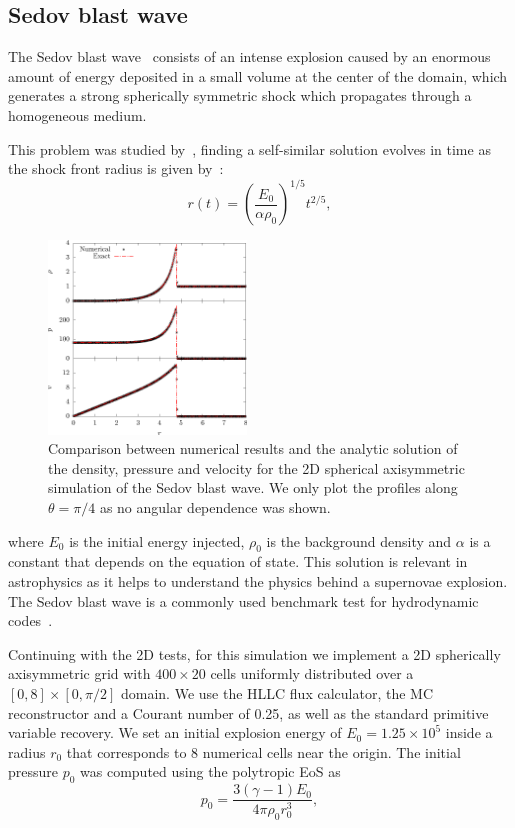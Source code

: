 
\subsection{Sedov blast wave}
\label{subsec:sedov}

The Sedov blast wave~\citep{sedov1959} consists of an intense explosion caused by an enormous amount of energy deposited in a small volume at the center of the domain, which generates a strong spherically symmetric shock which propagates through a homogeneous medium.

This problem was studied by~\citet{sedov1959}, finding a self-similar solution evolves in time as the shock front radius is given by~\citep{sedov1959,landau1987}:
\begin{equation}
    r(t) = \left( \frac{E_0}{\alpha \rho_0} \right)^{1/5} t^{2/5},
    \label{eq:self-sim-sedov}
\end{equation}

\begin{figure}
    \centering
    \includegraphics[width=0.47\textwidth]{Figures/sedov.eps}
    \caption{Comparison between numerical results and the analytic solution of the density, pressure and velocity  for the 2D spherical axisymmetric simulation of the Sedov blast wave. We only plot the profiles along $\theta = \pi/4$ as no angular dependence was shown.}
    \label{fig:sedov}
\end{figure}

\noindent where $E_0$ is the initial energy injected, $\rho_0$ is the background density and $\alpha$ is a constant that depends on the equation of state. This solution is relevant in astrophysics as it helps to understand the physics behind a supernovae explosion. The Sedov blast wave is a commonly used benchmark test for hydrodynamic codes~\citep{tasker2008}.

Continuing with the 2D tests, for this simulation we implement a 2D spherically axisymmetric grid with $400 \times 20$ cells uniformly distributed over a $[0,8]\times[0,\pi/2]$ domain. We use the HLLC flux calculator, the MC reconstructor and a Courant number of 0.25, as well as the standard primitive variable recovery. We set an initial explosion energy of $E_0 = 1.25 \times 10^5$ inside a radius $r_0$ that corresponds to 8 numerical cells near the origin. The initial pressure $p_0$ was computed using the polytropic EoS as
\begin{equation}
    p_0 = \frac{3(\gamma - 1) E_0}{4 \pi \rho_0 r_0^3},
\end{equation}

